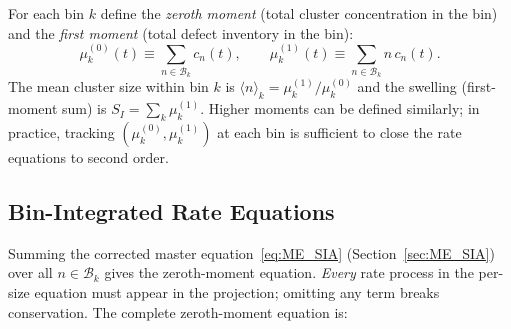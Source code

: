 \documentclass[pdflatex,sn-basic]{sn-jnl} %
\begin{document}
For each bin $k$ define the \emph{zeroth moment} (total cluster
concentration in the bin) and the \emph{first moment} (total defect
inventory in the bin):
\begin{equation}\label{eq:bin_moments_def}
    \mu_k^{(0)}(t) \equiv \sum_{n \in \mathcal{B}_k} c_n(t),
    \qquad
    \mu_k^{(1)}(t) \equiv \sum_{n \in \mathcal{B}_k} n\,c_n(t).
\end{equation}
The mean cluster size within bin $k$ is
$\langle n \rangle_k = \mu_k^{(1)}/\mu_k^{(0)}$ and the swelling
(first-moment sum) is $S_I = \sum_k \mu_k^{(1)}$. Higher moments
can be defined similarly; in practice, tracking $(\mu_k^{(0)},
\mu_k^{(1)})$ at each bin is sufficient to close the rate equations
to second order.

\subsection{Bin-Integrated Rate Equations}
\label{sec:bin_rate_eq}

Summing the corrected master equation~\eqref{eq:ME_SIA} (Section~\ref{sec:ME_SIA})
over all $n \in \mathcal{B}_k$ gives the zeroth-moment equation.
\emph{Every} rate process in the per-size equation must appear in
the projection; omitting any term breaks conservation.  The complete
zeroth-moment equation is:
\end{document}
